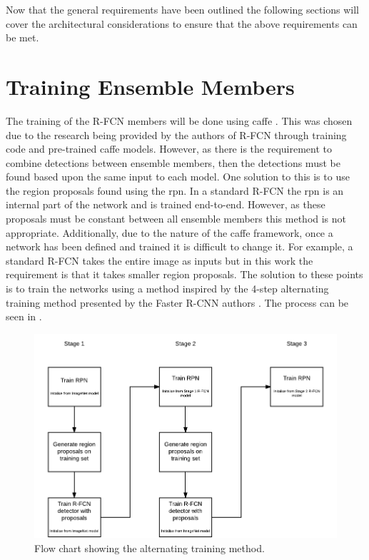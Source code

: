 Now that the general requirements have been outlined the following sections will cover the architectural considerations to ensure that the above requirements can be met.

\section{Training Ensemble Members}\label{sec:trainens}
The training of the R-FCN members will be done using \gls{caffe} \cite{caffe}. This was chosen due to the research being provided by the authors of R-FCN through training code and pre-trained \gls{caffe} models. However, as there is the requirement to combine detections between ensemble members, then the detections must be found based upon the same input to each model. One solution to this is to use the region proposals found using the \gls{rpn}. In a standard R-FCN the \gls{rpn} is an internal part of the network and is trained end-to-end. However, as these proposals must be constant between all ensemble members this method is not appropriate. Additionally, due to the nature of the \gls{caffe} framework, once a network has been defined and trained it is difficult to change it. For example, a standard R-FCN takes the entire image as inputs but in this work the requirement is that it takes smaller region proposals. The solution to these points is to train the networks using a method inspired by the 4-step alternating training method presented by the Faster R-CNN authors \cite{fasterrcnn}. The process can be seen in .

 \begin{figure}[H]
  \centering
    \includegraphics[width=1.0\textwidth]{Figs/Design/4steptrain1.pdf}
      \caption{Flow chart showing the alternating training method.}
    \label{fig:4steptrain}
\end{figure}

